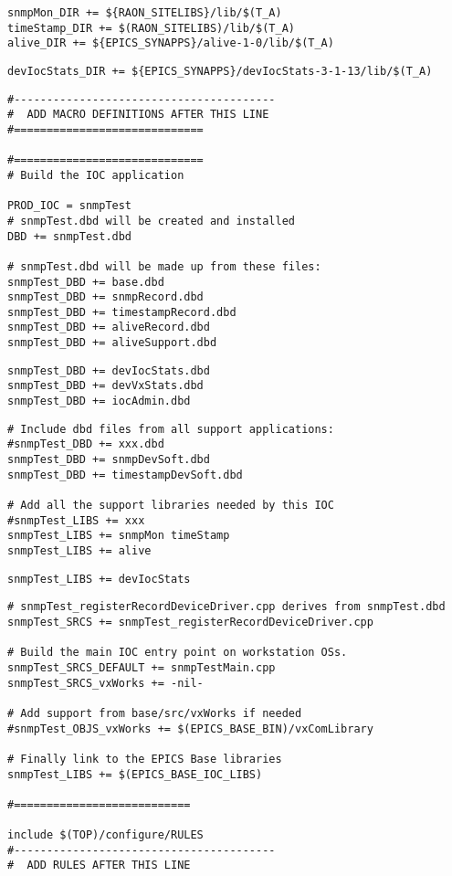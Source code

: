 \documentclass[11pt
  , a4paper
  , article
  , oneside
]{memoir}
\begin{document}
\begin{lstlisting}[style=termstyle]
snmpMon_DIR += ${RAON_SITELIBS}/lib/$(T_A)
timeStamp_DIR += $(RAON_SITELIBS)/lib/$(T_A)
alive_DIR += ${EPICS_SYNAPPS}/alive-1-0/lib/$(T_A)
\end{lstlisting}
\begin{lstlisting}[style=termstyle]
devIocStats_DIR += ${EPICS_SYNAPPS}/devIocStats-3-1-13/lib/$(T_A)
\end{lstlisting}

\begin{lstlisting}[style=termstyle]
#----------------------------------------
#  ADD MACRO DEFINITIONS AFTER THIS LINE
#=============================

#=============================
# Build the IOC application

PROD_IOC = snmpTest
# snmpTest.dbd will be created and installed
DBD += snmpTest.dbd

# snmpTest.dbd will be made up from these files:
snmpTest_DBD += base.dbd
snmpTest_DBD += snmpRecord.dbd
snmpTest_DBD += timestampRecord.dbd
snmpTest_DBD += aliveRecord.dbd   
snmpTest_DBD += aliveSupport.dbd
\end{lstlisting}
\begin{lstlisting}[style=termstyle]
snmpTest_DBD += devIocStats.dbd
snmpTest_DBD += devVxStats.dbd
snmpTest_DBD += iocAdmin.dbd
\end{lstlisting}

\begin{lstlisting}[style=termstyle]
# Include dbd files from all support applications:
#snmpTest_DBD += xxx.dbd
snmpTest_DBD += snmpDevSoft.dbd
snmpTest_DBD += timestampDevSoft.dbd

# Add all the support libraries needed by this IOC
#snmpTest_LIBS += xxx
snmpTest_LIBS += snmpMon timeStamp
snmpTest_LIBS += alive
\end{lstlisting}
\begin{lstlisting}[style=termstyle]
snmpTest_LIBS += devIocStats
\end{lstlisting}

\begin{lstlisting}[style=termstyle]
# snmpTest_registerRecordDeviceDriver.cpp derives from snmpTest.dbd
snmpTest_SRCS += snmpTest_registerRecordDeviceDriver.cpp

# Build the main IOC entry point on workstation OSs.
snmpTest_SRCS_DEFAULT += snmpTestMain.cpp
snmpTest_SRCS_vxWorks += -nil-

# Add support from base/src/vxWorks if needed
#snmpTest_OBJS_vxWorks += $(EPICS_BASE_BIN)/vxComLibrary

# Finally link to the EPICS Base libraries
snmpTest_LIBS += $(EPICS_BASE_IOC_LIBS)

#===========================

include $(TOP)/configure/RULES
#----------------------------------------
#  ADD RULES AFTER THIS LINE
\end{lstlisting}
\end{document}
